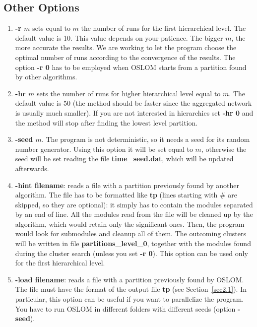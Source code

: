 \documentclass[11pt]{article}
\begin{document}
  \subsection{ {Other Options}}
  
   
  \begin{enumerate}
  
 \item \textbf{-r $m$} sets equal to $m$ the number of runs for the first
      hierarchical level. The default value is 10. 
This value depends on your patience. The bigger $m$, the more accurate the
results. We are working to let the program choose the optimal number
of runs according to the convergence of the results.
The option {\bf -r 0} has to be employed when OSLOM starts from a
partition found by other algorithms.  
  
   \item \textbf{-hr $m$} sets the number of runs for higher
     hierarchical level equal to $m$. The default value is 50 (the method
     should be faster since the aggregated network is usually much
     smaller). If you are not interested in hierarchies set
     \textbf{-hr 0} and the method will stop after finding the lowest
     level partition.
  
\item \textbf{-seed $m$}. The program is not deterministic, so it
  needs a seed for its random number generator. 
Using this option it will be set equal to $m$, otherwise the seed 
will be set reading the file \textbf{time\_seed.dat}, which will be updated afterwards. 


 \item \textbf{-hint filename}: reads a file with a partition
    previously found by another algorithm. The file has to be
    formatted like \textbf{tp}  (lines starting with \# are skipped,
    so they are optional): it simply has to contain the modules
    separated by an end of line. All the modules read from the file
    will be cleaned up by the algorithm, 
which would retain only the significant ones. Then, the program would
look for submodules and cleanup all of them. 
The outcoming clusters will be written in file
\textbf{partitions\_level\_0}, together with the 
modules found during the cluster search (unless you set \textbf{-r 0}). This option can be used only for the first hierarchical level.



\item \textbf{-load filename}: reads a file with a partition
previously found by OSLOM. The file must have the format of the output
file \textbf{tp} (see Section~\ref{sec2.1}). 
In particular, this option can be useful if you want to parallelize
the program. You have to run 
OSLOM in different folders with different seeds (option \textbf{-seed}).  
  




\end{enumerate}
\end{document}
